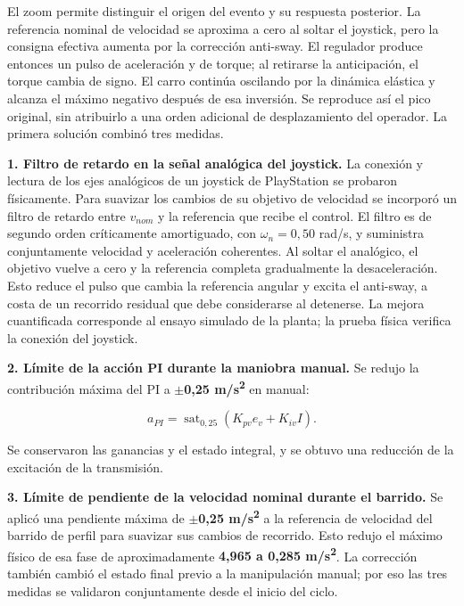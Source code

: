 \documentclass[a4paper,10pt,onecolumn,journal]{ieeeconf}
\numberwithin{equation}{section}
\begin{document}
El zoom permite distinguir el origen del evento y su respuesta posterior. La referencia nominal de velocidad se aproxima a cero al soltar el joystick, pero la consigna efectiva aumenta por la corrección anti-sway. El regulador produce entonces un pulso de aceleración y de torque; al retirarse la anticipación, el torque cambia de signo. El carro continúa oscilando por la dinámica elástica y alcanza el máximo negativo después de esa inversión. Se reproduce así el pico original, sin atribuirlo a una orden adicional de desplazamiento del operador.
La primera solución combinó tres medidas.

\textbf{1. Filtro de retardo en la señal analógica del joystick.}
La conexión y lectura de los ejes analógicos de un joystick de PlayStation se probaron físicamente. Para suavizar los cambios de su objetivo de velocidad se incorporó un filtro de retardo entre $v_{nom}$ y la referencia que recibe el control. El filtro es de segundo orden críticamente amortiguado, con $\omega_n=0,50$ rad/s, y suministra conjuntamente velocidad y aceleración coherentes. Al soltar el analógico, el objetivo vuelve a cero y la referencia completa gradualmente la desaceleración. Esto reduce el pulso que cambia la referencia angular y excita el anti-sway, a costa de un recorrido residual que debe considerarse al detenerse. La mejora cuantificada corresponde al ensayo simulado de la planta; la prueba física verifica la conexión del joystick.

\textbf{2. Límite de la acción PI durante la maniobra manual.} Se redujo la contribución máxima del PI a \textbf{\(\pm\)0,25 m/s\textsuperscript{2}} en manual:

\begin{equation}
a_{PI}=\operatorname{sat}_{0,25}(K_{pv}e_v+K_{iv}I).
\end{equation}

Se conservaron las ganancias y el estado integral, y se obtuvo una reducción de la excitación de la transmisión.

\textbf{3. Límite de pendiente de la velocidad nominal durante el barrido.} Se aplicó una pendiente máxima de \textbf{\(\pm\)0,25 m/s\textsuperscript{2}} a la referencia de velocidad del barrido de perfil para suavizar sus cambios de recorrido. Esto redujo el máximo físico de esa fase de aproximadamente \textbf{4,965 a 0,285 m/s\textsuperscript{2}}. La corrección también cambió el estado final previo a la manipulación manual; por eso las tres medidas se validaron conjuntamente desde el inicio del ciclo.
\end{document}
